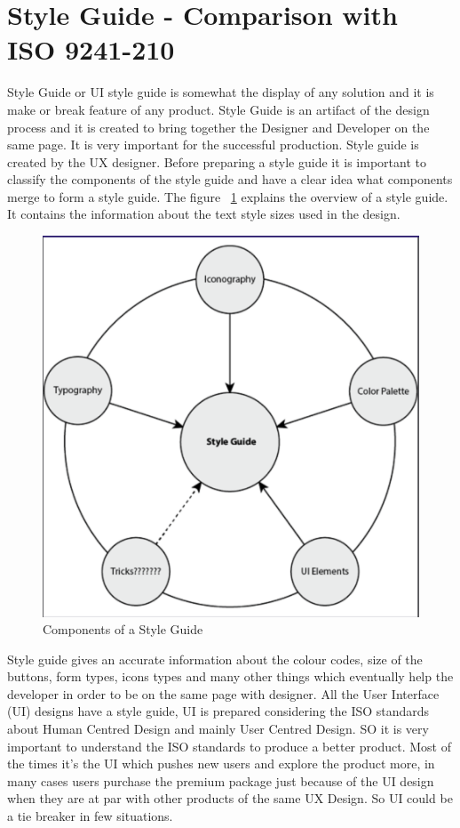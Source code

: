 \section{Style Guide - Comparison with ISO 9241-210}
Style Guide or UI style guide is somewhat the display of any solution and it is make or break feature of any product. Style Guide is an artifact of the design process and it  is created to bring together the Designer and Developer on the same page. It is very important for the successful production. Style guide is created by the UX designer. Before preparing a style guide it is important to classify the components of the style guide and have a clear idea what components merge to form a style guide. The figure ~\ref {fig:style} explains the overview of a style guide. It contains the information about the text style sizes used in the design. \par
\begin{figure}[htbp]
\begin{center}
\includegraphics[width=4 in, height=3 in]{style.png}
\caption{Components of a Style Guide}
\label{fig:style}
\end{center}
\end{figure}
Style guide gives an accurate information about the colour codes, size of the buttons, form types, icons types and many other things which eventually help the developer in order to be on the same page with designer. All the User Interface (UI) designs have a style guide, UI is prepared considering the ISO standards about Human Centred Design and mainly User Centred Design.  SO it is very important to understand the ISO standards to produce a better product. Most of the times it's the UI  which pushes new users and explore the product more, in many cases users purchase the premium package just because of the UI design when they are at par with other products of the same UX Design.  So UI could be a tie breaker in few situations. \par
